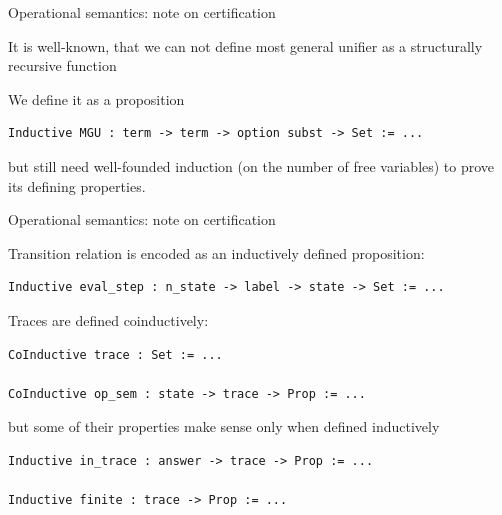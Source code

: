 \documentclass{beamer}
\theoremstyle{definition}
\theoremstyle{plain} %
\begin{document}
\begin{frame}[fragile]{Operational semantics: note on certification}

It is well-known, that we can not define most general unifier as a structurally recursive function

\vskip5mm

We define it as a proposition
\begin{lstlisting}
Inductive MGU : term -> term -> option subst -> Set := ...
\end{lstlisting}

\vskip5mm

but still need well-founded induction (on the number of free variables) to prove its defining properties.

\end{frame}



\begin{frame}[fragile]{Operational semantics: note on certification}

Transition relation is encoded as an inductively defined proposition:
\begin{lstlisting}
Inductive eval_step : n_state -> label -> state -> Set := ...
\end{lstlisting}

\vskip5mm

Traces are defined coinductively:
\begin{lstlisting}
CoInductive trace : Set := ...

CoInductive op_sem : state -> trace -> Prop := ...
\end{lstlisting}

\vskip3mm

but some of their properties make sense only when defined inductively
\begin{lstlisting}
Inductive in_trace : answer -> trace -> Prop := ...

Inductive finite : trace -> Prop := ...
\end{lstlisting}

\end{frame}
\end{document}
